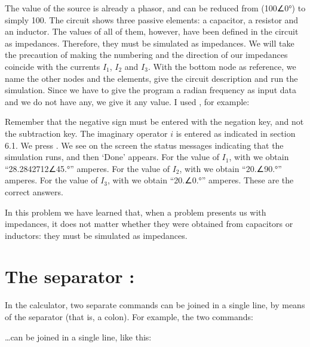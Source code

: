 The value of the source is already a phasor, and can be reduced from
(100∠0°) to simply 100. The circuit shows three passive elements: a
capacitor, a resistor and an inductor. The values of all of them,
however, have been defined in the circuit as impedances. Therefore,
they must be simulated as impedances. We will take the precaution of
making the numbering and the direction of our impedances coincide
with the currents $I_1$, $I_2$ and $I_3$. With the bottom node as
reference, we name the other nodes and the elements, give the
circuit description and run the simulation. Since we have to give
the program a radian frequency as input data and we do not have any,
we give it any value. I used , for example:


Remember that the negative sign must be entered with the negation
key, and not the subtraction key. The imaginary operator $i$ is
entered as indicated in section 6.1. We press . We see on
the screen the status messages indicating that the simulation runs,
and then `Done' appears. For the value of $I_1$, with
 we obtain ``28.2842712∠45.°'' amperes. For the
value of $I_2$, with  we obtain ``20.∠90.°''
amperes. For the value of $I_3$, with  we obtain
``20.∠0.°'' amperes. These are the correct answers.

In this problem we have learned that, when a problem presents us
with impedances, it does not matter whether they were obtained from
capacitors or inductors: they must be simulated as impedances.

\section{The separator :}

In the calculator, two separate commands can be joined in a single
line, by means of the separator \code{:} (that is, a colon). For
example, the two commands:


\ldots{}can be joined in a single line, like this:


